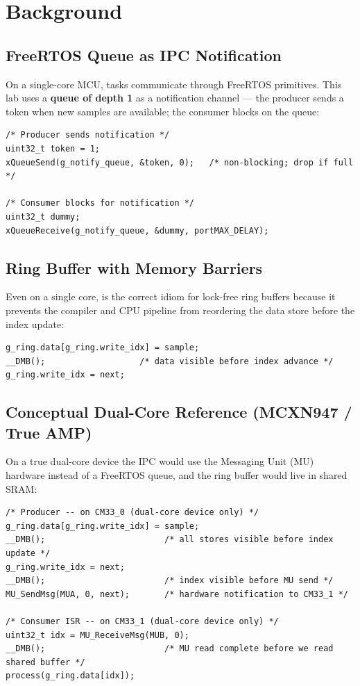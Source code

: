 \documentclass[11pt, a4paper]{article}
\begin{document}
\section{Background}

\subsection{FreeRTOS Queue as IPC Notification}

On a single-core MCU, tasks communicate through FreeRTOS primitives.
This lab uses a \textbf{queue of depth 1} as a notification channel --- the producer
sends a token when new samples are available; the consumer blocks on the queue:

\begin{lstlisting}[style=cstyle]
/* Producer sends notification */
uint32_t token = 1;
xQueueSend(g_notify_queue, &token, 0);   /* non-blocking; drop if full */

/* Consumer blocks for notification */
uint32_t dummy;
xQueueReceive(g_notify_queue, &dummy, portMAX_DELAY);
\end{lstlisting}

\subsection{Ring Buffer with Memory Barriers}

Even on a single core,  is the correct idiom for lock-free ring
buffers because it prevents the compiler and CPU pipeline from reordering
the data store before the index update:

\begin{lstlisting}[style=cstyle]
g_ring.data[g_ring.write_idx] = sample;
__DMB();                   /* data visible before index advance */
g_ring.write_idx = next;
\end{lstlisting}

\subsection{Conceptual Dual-Core Reference (MCXN947 / True AMP)}

On a true dual-core device the IPC would use the Messaging Unit (MU) hardware
instead of a FreeRTOS queue, and the ring buffer would live in shared SRAM:

\begin{lstlisting}[style=cstyle]
/* Producer -- on CM33_0 (dual-core device only) */
g_ring.data[g_ring.write_idx] = sample;
__DMB();                        /* all stores visible before index update */
g_ring.write_idx = next;
__DMB();                        /* index visible before MU send */
MU_SendMsg(MUA, 0, next);       /* hardware notification to CM33_1 */

/* Consumer ISR -- on CM33_1 (dual-core device only) */
uint32_t idx = MU_ReceiveMsg(MUB, 0);
__DMB();                        /* MU read complete before we read shared buffer */
process(g_ring.data[idx]);
\end{lstlisting}
\end{document}
